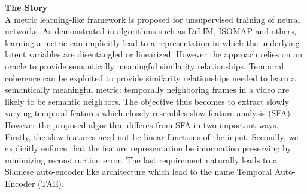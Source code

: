 \documentclass[12pt,a4paper]{report}
\begin{document}
\noindent
{\bf The Story} \\
A metric learning-like framework is proposed for unsupervised training of neural networks. As demonstrated in algorithms such as DrLIM, ISOMAP and others, learning a metric can implicitly lead to a representation in which the underlying latent variables are disentangled or linearized. However the approach relies on an oracle to provide semantically meaningful similarity relationships. Temporal coherence can be exploited to provide similarity relationships needed to learn a semantically meaningful metric: temporally neighboring frames in a video are likely to be semantic neighbors. The objective thus becomes to extract slowly varying temporal features which closely resembles slow feature analysis (SFA). However the proposed algorithm differes from SFA in two important ways. Firstly, the slow features need not be linear functions of the input. Secondly, we explicitly enforce that the feature representation be information preserving by minimizing reconstruction error. The last requirement naturally leads to a Siamese auto-encoder like architecture which lead to the name Temporal Auto-Encoder (TAE). \\ \\
\end{document}
